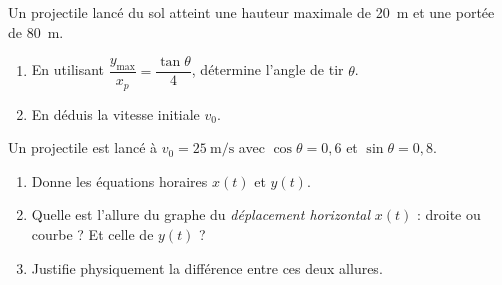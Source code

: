 \documentclass[11pt,a4paper]{article}
\begin{document}
\begin{exo}
Un projectile lancé du sol atteint une hauteur maximale de \qty{20}{\metre} et une portée de \qty{80}{\metre}.
\begin{enumerate}[label=\alph*)]
  \item En utilisant $\dfrac{y_{\max}}{x_p}=\dfrac{\tan\theta}{4}$, détermine l'angle de tir $\theta$.
  \item En déduis la vitesse initiale $v_0$.
\end{enumerate}
\end{exo}

\begin{exo}
Un projectile est lancé à $v_0=\qty{25}{\metre\per\second}$ avec $\cos\theta=0{,}6$ et $\sin\theta=0{,}8$.
\begin{enumerate}[label=\alph*)]
  \item Donne les équations horaires $x(t)$ et $y(t)$.
  \item Quelle est l'allure du graphe du \emph{déplacement horizontal} $x(t)$ : droite ou courbe ? Et celle de $y(t)$ ?
  \item Justifie physiquement la différence entre ces deux allures.
\end{enumerate}
\end{exo}
\end{document}
